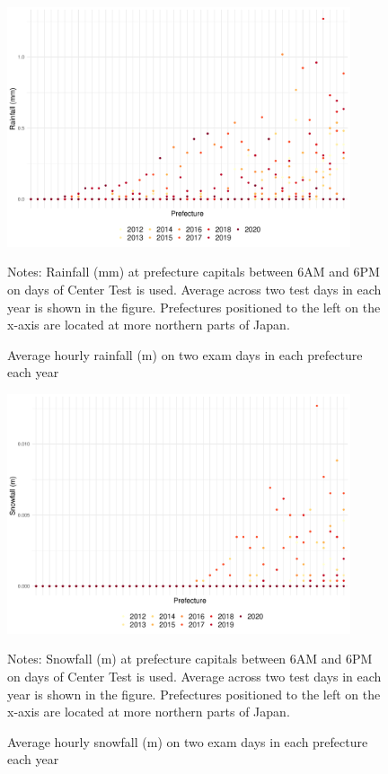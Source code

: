 \documentclass[12pt,letterpaper]{article}
\begin{document}
\begin{figure}[H]
  \centering
  \caption{Average hourly rainfall (m) on two exam days in each prefecture each year}
  \includegraphics[width = 0.9\textwidth]{../Output/images/rainfall_diff.pdf}
  \label{fig:rainfall_diff}
  \footnotesize
  \begin{tablenotes}
    \item Notes:
      Rainfall (mm) at prefecture capitals between 6AM and 6PM on days of Center Test is used.
      Average across two test days in each year is shown in the figure.
      Prefectures positioned to the left on the x-axis are located at more northern parts of Japan.
  \end{tablenotes}
\end{figure}

\begin{figure}[H]
  \centering
  \caption{Average hourly snowfall (m) on two exam days in each prefecture each year}
  \includegraphics[width = 0.9\textwidth]{../Output/images/snowfall_diff.pdf}
  \label{fig:snowfall_diff}
  \footnotesize
  \begin{tablenotes}
    \item Notes:
      Snowfall (m) at prefecture capitals between 6AM and 6PM on days of Center Test is used.
      Average across two test days in each year is shown in the figure.
      Prefectures positioned to the left on the x-axis are located at more northern parts of Japan.
  \end{tablenotes}
\end{figure}
\end{document}
